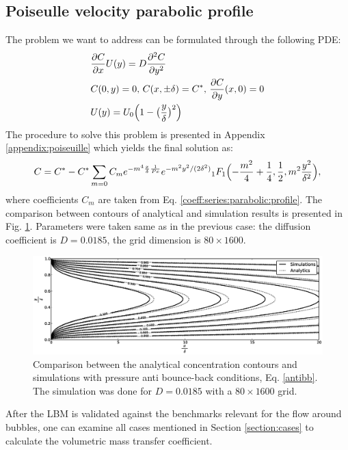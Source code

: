\documentclass{article}
\newcommand{\beq}{\begin{equation}}
\newcommand{\feq}{\end{equation}}
\newcommand{\cstar}{C^{*}}
\begin{document}
\subsection{Poiseulle velocity parabolic profile}
The problem we want to address can be formulated through the following PDE:
\beq
\begin{aligned}
&\frac{\partial C}{\partial x} U(y)=D\frac{\partial^2 C}{\partial y^2}\\
&C(0,y)=0,\, C(x,\pm \delta)=\cstar,\, \frac{\partial C}{\partial y }(x,0)=0\\
&U(y)=U_0 \Bigl(1-\bigl(\frac{y}{\delta}\bigr)^2\Bigr)
\end{aligned}
\feq
The procedure to solve this problem is presented in Appendix \ref{appendix:poiseuille} which yields
the final solution as:
\begin{equation}
C=\cstar-\cstar \sum_{m=0}{C_m e^{-m^4 \frac{x}{\delta}\frac{1}{Pe}} e^{-m^2
y^2/(2\delta^2)}{_1F_1}\Bigl(-\frac{m^2}{4}+\frac{1}{4},\frac{1}{2},m^2 \frac{y^2}{\delta^2}\Bigr)},
\end{equation}
where coefficients $C_m$ are taken from Eq. \ref{coeff:series:parabolic:profile}. The comparison
between contours of analytical and simulation results is presented in Fig.
\ref{fig:parabolic:comparison}. Parameters were taken  same as in the previous case: the
diffusion coefficient is $D=0.0185$, the grid dimension is $80\times1600$. 
\begin{figure}[htb!]
\includegraphics[width=\textwidth]{Figures/parabolic_profile_comparison.eps}
\caption{Comparison between the analytical concentration contours and simulations with pressure
anti bounce-back conditions, Eq. \ref{antibb}. The simulation was done for $D=0.0185$ with a
$80\times1600$ grid. \label{fig:parabolic:comparison}}
\end{figure}

After the LBM is validated against the benchmarks relevant for the flow around bubbles, one can
examine all cases mentioned in Section
\ref{section:cases} to calculate the volumetric mass transfer coefficient.
\end{document}
